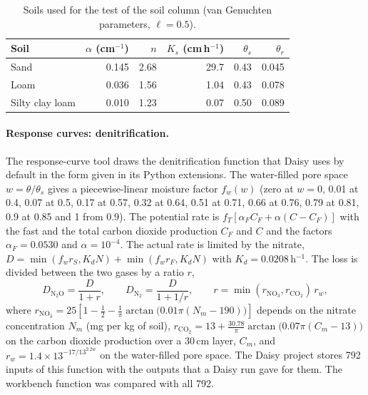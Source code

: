 \documentclass[preprint,12pt]{elsarticle}
\begin{document}
\begin{table}[H]\centering\small
\caption{Soils used for the test of the soil column (van Genuchten parameters, $\ell=0.5$).}\label{tab:richardssoils}
\begin{tabular}{lrrrrr}\toprule
Soil & $\alpha$ (cm$^{-1}$) & $n$ & $K_s$ (cm\,h$^{-1}$) & $\theta_s$ & $\theta_r$\\\midrule
Sand & 0.145 & 2.68 & 29.7 & 0.43 & 0.045\\
Loam & 0.036 & 1.56 & 1.04 & 0.43 & 0.078\\
Silty clay loam & 0.010 & 1.23 & 0.07 & 0.50 & 0.089\\\bottomrule
\end{tabular}
\end{table}

\paragraph{Response curves: denitrification.}
The response-curve tool draws the denitrification function that Daisy uses by default in the form given in its Python extensions. The water-filled pore space $w=\theta/\theta_s$ gives a piecewise-linear moisture factor $f_w(w)$ (zero at $w=0$, 0.01 at 0.4, 0.07 at 0.5, 0.17 at 0.57, 0.32 at 0.64, 0.51 at 0.71, 0.66 at 0.76, 0.79 at 0.81, 0.9 at 0.85 and 1 from 0.9). The potential rate is $f_T\left[\alpha_F C_F+\alpha(C-C_F)\right]$ with the fast and the total carbon dioxide production $C_F$ and $C$ and the factors $\alpha_F=0.0530$ and $\alpha=10^{-4}$. The actual rate is limited by the nitrate, $D=\min(f_w r_S,K_dN)+\min(f_w r_F,K_dN)$ with $K_d=0.0208$\,h$^{-1}$. The loss is divided between the two gases by a ratio $r$,
\begin{equation}\label{eq:n2o}
D_{\mathrm{N_2O}}=\frac{D}{1+r},\qquad D_{\mathrm{N_2}}=\frac{D}{1+1/r},\qquad r=\min(r_{\mathrm{NO_3}},r_{\mathrm{CO_2}})\,r_w,
\end{equation}
where $r_{\mathrm{NO_3}}=25\left[1-\tfrac12-\tfrac1\pi\arctan\!\big(0.01\pi(N_m-190)\big)\right]$ depends on the nitrate concentration $N_m$ (mg per kg of soil), $r_{\mathrm{CO_2}}=13+\tfrac{30.78}{\pi}\arctan\!\big(0.07\pi(C_m-13)\big)$ on the carbon dioxide production over a 30\,cm layer, $C_m$, and $r_w=1.4\times13^{-17/13^{2.2w}}$ on the water-filled pore space. The Daisy project stores 792 inputs of this function with the outputs that a Daisy run gave for them. The workbench function was compared with all 792.
\end{document}
